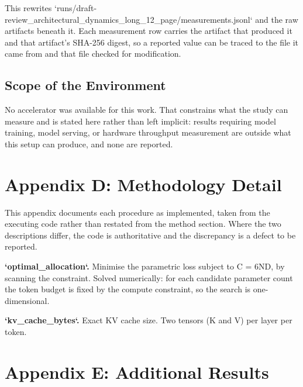 \documentclass[11pt,a4paper]{article}
\begin{document}
This rewrites `runs/draft-review\_architectural\_dynamics\_long\_12\_page/measurements.jsonl` and the raw artifacts beneath it. Each measurement row carries the artifact that produced it and that artifact's SHA-256 digest, so a reported value can be traced to the file it came from and that file checked for modification.


\subsection{Scope of the Environment}


No accelerator was available for this work. That constrains what the study can measure and is stated here rather than left implicit: results requiring model training, model serving, or hardware throughput measurement are outside what this setup can produce, and none are reported.




\section{Appendix D: Methodology Detail}


This appendix documents each procedure as implemented, taken from the executing code rather than restated from the method section. Where the two descriptions differ, the code is authoritative and the discrepancy is a defect to be reported.

\textbf{`optimal\_allocation`.} Minimise the parametric loss subject to C = 6ND, by scanning the constraint. Solved numerically: for each candidate parameter count the token budget is fixed by the compute constraint, so the search is one-dimensional.

\textbf{`kv\_cache\_bytes`.} Exact KV cache size. Two tensors (K and V) per layer per token.




\section{Appendix E: Additional Results}
\end{document}
